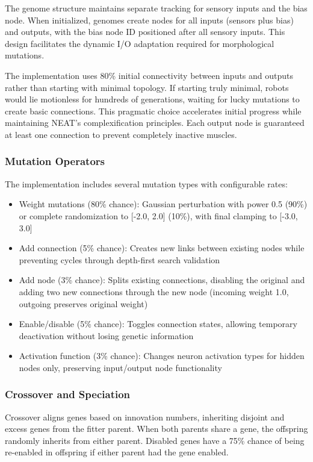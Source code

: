 \documentclass[conference]{IEEEtran}
\begin{document}
The genome structure maintains separate tracking for sensory inputs and the bias node. When initialized, genomes create nodes for all inputs (sensors plus bias) and outputs, with the bias node ID positioned after all sensory inputs. This design facilitates the dynamic I/O adaptation required for morphological mutations.

The implementation uses 80\% initial connectivity between inputs and outputs rather than starting with minimal topology. If starting truly minimal, robots would lie motionless for hundreds of generations, waiting for lucky mutations to create basic connections. This pragmatic choice accelerates initial progress while maintaining NEAT's complexification principles. Each output node is guaranteed at least one connection to prevent completely inactive muscles.

\subsubsection{Mutation Operators}
The implementation includes several mutation types with configurable rates:
\begin{itemize}
    \item Weight mutations (80\% chance): Gaussian perturbation with power 0.5 (90\%) or complete randomization to [-2.0, 2.0] (10\%), with final clamping to [-3.0, 3.0]
    \item Add connection (5\% chance): Creates new links between existing nodes while preventing cycles through depth-first search validation
    \item Add node (3\% chance): Splits existing connections, disabling the original and adding two new connections through the new node (incoming weight 1.0, outgoing preserves original weight)
    \item Enable/disable (5\% chance): Toggles connection states, allowing temporary deactivation without losing genetic information
    \item Activation function (3\% chance): Changes neuron activation types for hidden nodes only, preserving input/output node functionality
\end{itemize}

\subsubsection{Crossover and Speciation}
Crossover aligns genes based on innovation numbers, inheriting disjoint and excess genes from the fitter parent. When both parents share a gene, the offspring randomly inherits from either parent. Disabled genes have a 75\% chance of being re-enabled in offspring if either parent had the gene enabled.
\end{document}
